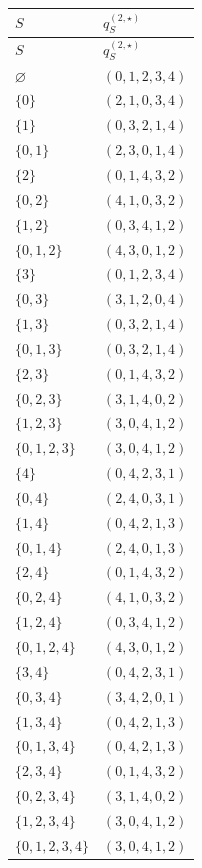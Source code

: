 \documentclass[11pt]{article}
\begin{document}
\begin{center}
\small
\begin{longtable}{@{}ll@{}}
\toprule
$S$ & $q^{(2,\star)}_S$ \\
\midrule
\endfirsthead
\toprule
$S$ & $q^{(2,\star)}_S$ \\
\midrule
\endhead
$\varnothing$ & $(0,1,2,3,4)$ \\
$\{0\}$ & $(2,1,0,3,4)$ \\
$\{1\}$ & $(0,3,2,1,4)$ \\
$\{0,1\}$ & $(2,3,0,1,4)$ \\
$\{2\}$ & $(0,1,4,3,2)$ \\
$\{0,2\}$ & $(4,1,0,3,2)$ \\
$\{1,2\}$ & $(0,3,4,1,2)$ \\
$\{0,1,2\}$ & $(4,3,0,1,2)$ \\
$\{3\}$ & $(0,1,2,3,4)$ \\
$\{0,3\}$ & $(3,1,2,0,4)$ \\
$\{1,3\}$ & $(0,3,2,1,4)$ \\
$\{0,1,3\}$ & $(0,3,2,1,4)$ \\
$\{2,3\}$ & $(0,1,4,3,2)$ \\
$\{0,2,3\}$ & $(3,1,4,0,2)$ \\
$\{1,2,3\}$ & $(3,0,4,1,2)$ \\
$\{0,1,2,3\}$ & $(3,0,4,1,2)$ \\
$\{4\}$ & $(0,4,2,3,1)$ \\
$\{0,4\}$ & $(2,4,0,3,1)$ \\
$\{1,4\}$ & $(0,4,2,1,3)$ \\
$\{0,1,4\}$ & $(2,4,0,1,3)$ \\
$\{2,4\}$ & $(0,1,4,3,2)$ \\
$\{0,2,4\}$ & $(4,1,0,3,2)$ \\
$\{1,2,4\}$ & $(0,3,4,1,2)$ \\
$\{0,1,2,4\}$ & $(4,3,0,1,2)$ \\
$\{3,4\}$ & $(0,4,2,3,1)$ \\
$\{0,3,4\}$ & $(3,4,2,0,1)$ \\
$\{1,3,4\}$ & $(0,4,2,1,3)$ \\
$\{0,1,3,4\}$ & $(0,4,2,1,3)$ \\
$\{2,3,4\}$ & $(0,1,4,3,2)$ \\
$\{0,2,3,4\}$ & $(3,1,4,0,2)$ \\
$\{1,2,3,4\}$ & $(3,0,4,1,2)$ \\
$\{0,1,2,3,4\}$ & $(3,0,4,1,2)$ \\
\bottomrule
\end{longtable}
\end{center}
\end{document}
